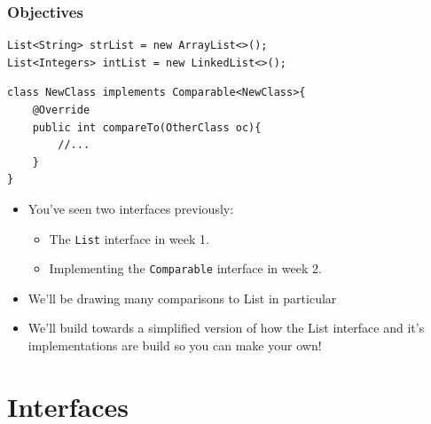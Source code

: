 \documentclass{beamer}
\begin{document}
\begin{frame}[fragile]
    \frametitle{Objectives}
    \begin{minipage}{0.59\textwidth}
        \begin{lstlisting}[basicstyle=\tiny]
List<String> strList = new ArrayList<>();
List<Integers> intList = new LinkedList<>();
        \end{lstlisting}
        \vfill
        \begin{lstlisting}[basicstyle=\tiny]
class NewClass implements Comparable<NewClass>{
    @Override
    public int compareTo(OtherClass oc){
        //...
    }
}
        \end{lstlisting}
        \vfill
    \begin{itemize}
        \item You've seen two interfaces previously:
        \begin{itemize}
            \item The \lstinline|List| interface in week 1.
            \item Implementing the \lstinline|Comparable|  interface in week 2.
        \end{itemize}
    \end{itemize}
    \end{minipage}
    \begin{minipage}{0.39\textwidth}
    \begin{itemize}
        
        \item We'll be drawing many comparisons to List in particular
    
        \item We'll build towards a simplified version of how the List interface and it's implementations are build so you can make your own!
    \end{itemize}
    \end{minipage}
\end{frame}

\section{Interfaces}
\end{document}

